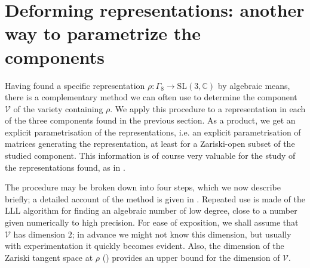 \section{Deforming representations: another way to parametrize the components}\label{deformation}

Having found a specific representation $\rho: \Gamma_8 \to \mathrm{SL(3,\mathbb C)}$ by
algebraic means, there is a complementary method we can often use to determine
the component $\mathcal{V}$ of the variety containing $\rho$. We apply this procedure to a representation in each of the three components found in the previous section. As a product, we get an explicit parametrisation of the representations, i.e. an explicit parametrisation of matrices generating the representation, at least for a Zariski-open subset of the studied component. This information is of course very valuable for the study of the representations found, as in \cite{DF}.


The procedure may be broken
down into four steps, which we now describe briefly; a detailed account of the
method is given in \cite{CLTb}.  Repeated use is made of the LLL algorithm \cite{LLL}
for finding an algebraic number of low degree, close to a number given numerically to
high precision.  For ease of exposition, we shall assume that
$\mathcal{V}$ has dimension $2$; in advance we might not know this dimension,
but usually with experimentation it quickly becomes evident.  Also, the dimension of
the Zariski tangent space at $\rho$ (\cite{CLTa}) provides an upper bound for the
dimension of $\mathcal{V}$.


